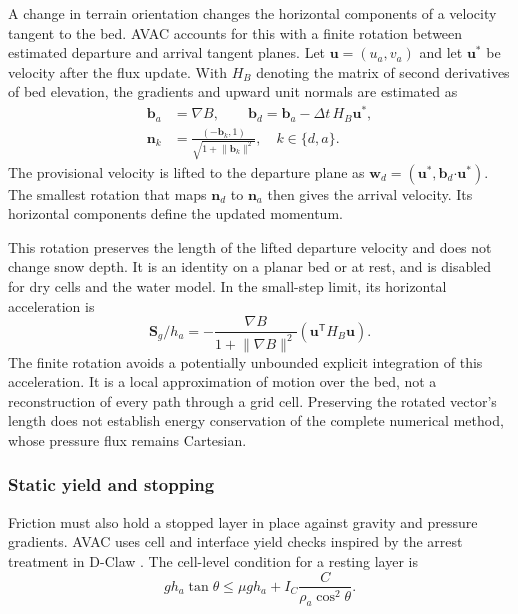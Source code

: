 \documentclass[11pt,a4paper]{article}
\begin{document}
A change in terrain orientation changes the horizontal components of a
velocity tangent to the bed. AVAC accounts for this with a finite rotation
between estimated departure and arrival tangent planes. Let
$\boldsymbol{u}=(u_a,v_a)$ and let $\boldsymbol{u}^{*}$ be velocity after
the flux update. With $H_B$ denoting the matrix of second derivatives of
bed elevation, the gradients and upward unit normals are estimated as
\begin{equation}
  \begin{aligned}
    \boldsymbol{b}_a&=\nabla B,\qquad
    \boldsymbol{b}_d=\boldsymbol{b}_a-\Delta t\,H_B\boldsymbol{u}^{*},\\
    \boldsymbol{n}_k&=\frac{(-\boldsymbol{b}_k,1)}
    {\sqrt{1+\lVert\boldsymbol{b}_k\rVert^2}},\quad k\in\{d,a\}.
  \end{aligned}
  \label{eq:avac-transport-normals}
\end{equation}
The provisional velocity is lifted to the departure plane as
$\boldsymbol{w}_d=(\boldsymbol{u}^{*},
\boldsymbol{b}_d\boldsymbol{\cdot}\boldsymbol{u}^{*})$.
The smallest rotation that maps $\boldsymbol{n}_d$ to $\boldsymbol{n}_a$
then gives the arrival velocity. Its horizontal components define the
updated momentum.

This rotation preserves the length of the lifted departure velocity and
does not change snow depth. It is an identity on a planar bed or at rest,
and is disabled for dry cells and the water model. In the small-step limit,
its horizontal acceleration is
\begin{equation}
  \boldsymbol{S}_g/h_a=
  -\frac{\nabla B}{1+\lVert\nabla B\rVert^2}
  \left(\boldsymbol{u}^{\mathsf T}H_B\boldsymbol{u}\right).
  \label{eq:avac-geometric-source}
\end{equation}
The finite rotation avoids a potentially unbounded explicit integration of
this acceleration. It is a local approximation of motion over the bed, not
a reconstruction of every path through a grid cell. Preserving the rotated
vector's length does not establish energy conservation of the complete
numerical method, whose pressure flux remains Cartesian.

\subsubsection{Static yield and stopping}

Friction must also hold a stopped layer in place against gravity and pressure
gradients. AVAC uses cell and interface yield checks inspired by the arrest
treatment in D-Claw \citep{GeorgeIverson2014}. The cell-level condition for
a resting layer is
\begin{equation}
  g h_a\tan\theta
  \leq \mu g h_a+I_C\frac{C}{\rho_a\cos^2\theta}.
  \label{eq:avac-cell-yield}
\end{equation}
\end{document}

